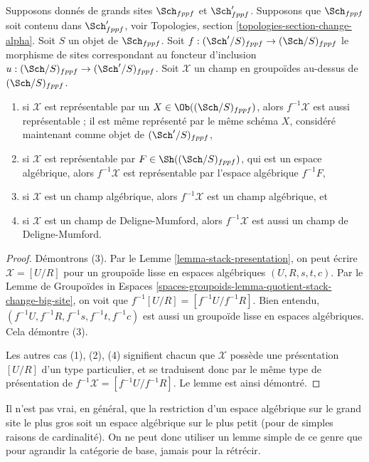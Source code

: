 \begin{lemma}
\label{lemma-change-big-site}
Supposons donnés de grands sites $\Sch_{fppf}$ et $\Sch'_{fppf}$.
Supposons que $\Sch_{fppf}$ soit contenu dans $\Sch'_{fppf}$,
voir Topologies, section \ref{topologies-section-change-alpha}.
Soit $S$ un objet de $\Sch_{fppf}$.
Soit $f : (\Sch'/S)_{fppf} \to (\Sch/S)_{fppf}$ le morphisme
de sites correspondant au foncteur d'inclusion
$u : (\Sch/S)_{fppf} \to (\Sch'/S)_{fppf}$.
Soit $\mathcal{X}$ un champ en groupoïdes au-dessus de $(\Sch/S)_{fppf}$.
\begin{enumerate}
\item si $\mathcal{X}$ est représentable par un
$X \in \Ob((\Sch/S)_{fppf})$, alors
$f^{-1}\mathcal{X}$ est aussi représentable ; il est même représenté par le
même schéma $X$, considéré maintenant comme objet de $(\Sch'/S)_{fppf}$,
\item si $\mathcal{X}$ est représentable par
$F \in \Sh((\Sch/S)_{fppf})$, qui est
un espace algébrique, alors $f^{-1}\mathcal{X}$ est représentable
par l'espace algébrique $f^{-1}F$,
\item si $\mathcal{X}$ est un champ algébrique, alors $f^{-1}\mathcal{X}$
est un champ algébrique, et
\item si $\mathcal{X}$ est un champ de Deligne-Mumford, alors $f^{-1}\mathcal{X}$
est aussi un champ de Deligne-Mumford.
\end{enumerate}
\end{lemma}

\begin{proof}
Démontrons (3). Par le
Lemme \ref{lemma-stack-presentation},
on peut écrire $\mathcal{X} = [U/R]$ pour un groupoïde lisse
en espaces algébriques $(U, R, s, t, c)$. Par le
Lemme de Groupoïdes in Espaces
\ref{spaces-groupoids-lemma-quotient-stack-change-big-site},
on voit que $f^{-1}[U/R] = [f^{-1}U/f^{-1}R]$.
Bien entendu, $(f^{-1}U, f^{-1}R, f^{-1}s, f^{-1}t, f^{-1}c)$
est aussi un groupoïde lisse en espaces algébriques. Cela démontre (3).

\medskip\noindent
Les autres cas (1), (2), (4) signifient chacun que $\mathcal{X}$ possède
une présentation $[U/R]$ d'un type particulier, et se traduisent donc par le
même type de présentation de $f^{-1}\mathcal{X} = [f^{-1}U/f^{-1}R]$.
Le lemme est ainsi démontré.
\end{proof}

\noindent
Il n'est pas vrai, en général, que la restriction d'un espace algébrique
sur le grand site le plus gros soit un espace algébrique sur le plus petit (pour de simples
raisons de cardinalité). On ne peut donc utiliser un lemme simple de ce
genre que pour agrandir la catégorie de base, jamais pour la rétrécir.

